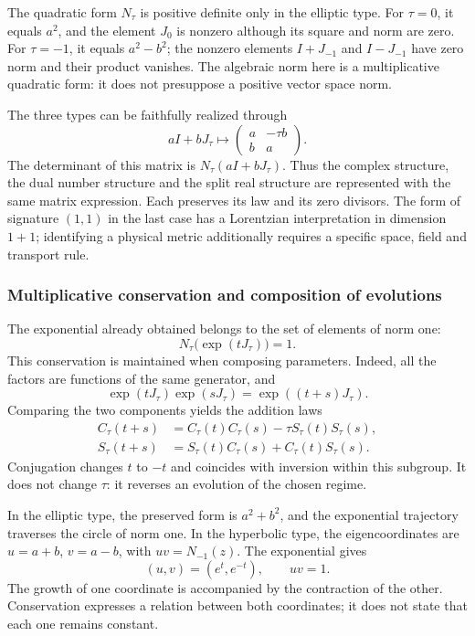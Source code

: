 The quadratic form \(N_\tau\) is positive definite only in the elliptic type.
For \(\tau=0\), it equals \(a^2\), and the element \(J_0\) is nonzero although its
square and norm are zero. For \(\tau=-1\), it equals \(a^2-b^2\); the
nonzero elements \(I+J_{-1}\) and \(I-J_{-1}\) have zero norm and their
product vanishes. The algebraic norm here is a multiplicative quadratic
form: it does not presuppose a positive vector space norm.

The three types can be faithfully realized through
\[
 aI+bJ_\tau\longmapsto
 \begin{pmatrix}a&-\tau b\\b&a\end{pmatrix}.
\]
The determinant of this matrix is \(N_\tau(aI+bJ_\tau)\). Thus the
complex structure, the dual number structure and the split real structure
are represented with the same matrix expression.
Each preserves its law and its zero divisors. The form of signature
\((1,1)\) in the last case has a Lorentzian interpretation in dimension
\(1+1\); identifying a physical metric additionally requires a specific space,
field and transport rule.

\subsubsection{Multiplicative conservation and composition of evolutions}
\label{x_reciprocidad:trit-ampl-evoluciones}

The exponential already obtained belongs to the set of elements of norm one:
\[
 N_\tau\bigl(\exp(tJ_\tau)\bigr)=1.
\]
This conservation is maintained when composing parameters. Indeed, all the
factors are functions of the same generator, and
\[
 \exp(tJ_\tau)\exp(sJ_\tau)=\exp((t+s)J_\tau).
\]
Comparing the two components yields the addition laws
\begin{align}
 C_\tau(t+s)&=C_\tau(t)C_\tau(s)-\tau S_\tau(t)S_\tau(s),\\
 S_\tau(t+s)&=S_\tau(t)C_\tau(s)+C_\tau(t)S_\tau(s).
\end{align}
Conjugation changes \(t\) to \(-t\) and coincides with inversion within
this subgroup. It does not change \(\tau\): it reverses an evolution of the chosen
regime.

In the elliptic type, the preserved form is \(a^2+b^2\), and the exponential
trajectory traverses the circle of norm one. In the hyperbolic type, the
eigencoordinates are \(u=a+b\), \(v=a-b\), with \(uv=N_{-1}(z)\).
The exponential gives
\[
 (u,v)=(e^t,e^{-t}),\qquad uv=1.
\]
The growth of one coordinate is accompanied by the contraction of the other.
Conservation expresses a relation between both coordinates; it does not state that
each one remains constant.

